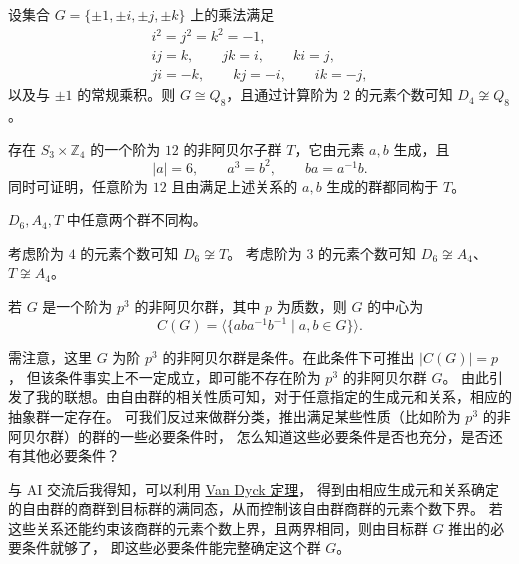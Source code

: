 \begin{proposition}\label{prop:quaternion-multiplication}
设集合 $G=\{\pm1,\pm i,\pm j,\pm k\}$ 上的乘法满足
\[
  \begin{gathered}
    i^2=j^2=k^2=-1,\\
    ij=k,\qquad jk=i,\qquad ki=j,\\
    ji=-k,\qquad kj=-i,\qquad ik=-j,
  \end{gathered}
\]
以及与 $\pm1$ 的常规乘积。则 $G\cong Q_8$，且通过计算阶为 $2$ 的元素个数可知 $D_4\not\cong Q_8$。
\end{proposition}

\begin{proposition}\label{prop:group-t-in-s3-times-z4}
存在 $S_3\times\mathbb Z_4$ 的一个阶为 $12$ 的非阿贝尔子群 $T$，它由元素 $a,b$ 生成，且
\[
  |a|=6,\qquad a^3=b^2,\qquad ba=a^{-1}b.
\]
同时可证明，任意阶为 $12$ 且由满足上述关系的 $a,b$ 生成的群都同构于 $T$。
\end{proposition}

\begin{proposition}\label{prop:distinct-nonabelian-groups-of-order-twelve}
$D_6,A_4,T$ 中任意两个群不同构。
\end{proposition}

\begin{purplenote}
考虑阶为 $4$ 的元素个数可知 $D_6\not\cong T$。
考虑阶为 $3$ 的元素个数可知 $D_6\not\cong A_4$、$T\not\cong A_4$。
\end{purplenote}

\begin{proposition}\label{prop:center-commutator-nonabelian-order-prime-cubed}
若 $G$ 是一个阶为 $p^3$ 的非阿贝尔群，其中 $p$ 为质数，则 $G$ 的中心为
\[
  C(G)=\bigl\langle\{aba^{-1}b^{-1}\mid a,b\in G\}\bigr\rangle.
\]
\end{proposition}

\begin{purplenote}
需注意，这里 $G$ 为阶 $p^3$ 的非阿贝尔群是条件。在此条件下可推出 $|C(G)|=p$，
但该条件事实上不一定成立，即可能不存在阶为 $p^3$ 的非阿贝尔群 $G$。
由此引发了我的联想。由自由群的相关性质可知，对于任意指定的生成元和关系，相应的抽象群一定存在。
可我们反过来做群分类，推出满足某些性质（比如阶为 $p^3$ 的非阿贝尔群）的群的一些必要条件时，
怎么知道这些必要条件是否也充分，是否还有其他必要条件？

与 AI 交流后我得知，可以利用 \hyperref[thm:van-dyck]{Van Dyck 定理}，
得到由相应生成元和关系确定的自由群的商群到目标群的满同态，从而控制该自由群商群的元素个数下界。
若这些关系还能约束该商群的元素个数上界，且两界相同，则由目标群 $G$ 推出的必要条件就够了，
即这些必要条件能完整确定这个群 $G$。
\end{purplenote}
